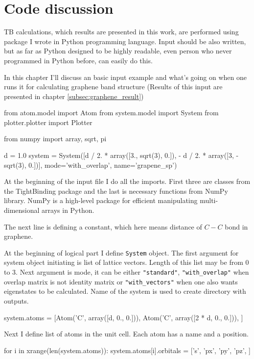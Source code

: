 \chapter{Code discussion}
TB calculations, which results are presented in this work, are performed using package I wrote in Python programming language. Input should be also written, but as far as Python designed to be highly readable, even person who never programmed in Python before, can easily do this. 

In this chapter I'll discuss an basic input example and what's going on when one runs it for calculating graphene band structure (Results of this input are presented in chapter \ref{subsec:graphene_result})

\begin{python}
from atom.model import Atom
from system.model import System
from plotter.plotter import Plotter

from numpy import array, sqrt, pi

d = 1.0
system = System([d / 2. * array([3., sqrt(3), 0.]),
                 - d / 2. * array([3, -sqrt(3), 0.])],
                mode='with_overlap', name='grapene_sp')
\end{python}
 
At the beginning of the input file I do all the imports. First three are classes from the TightBinding package and the last is necessary functions from NumPy library. NumPy is a high-level package for efficient manipulating multi-dimensional arrays in Python. 

The next line is defining a constant, which here means distance of $C-C$ bond in graphene.

At the beginning of logical part I define \verb!System! object. The first argument for system object initiating is list of lattice vectors. Length of this list may be from $0$ to $3$. Next argument is mode, it can be either \verb!"standard"!, \verb!"with_overlap"! when overlap matrix is not identity matrix or \verb!"with_vectors"! when one also wants eigenstates to be calculated. Name of the system is used to create directory with outputs.

\begin{python}
system.atoms = [Atom('C', array([d, 0., 0.])),
                Atom('C', array([2 * d, 0., 0.])), ]
\end{python}

Next I define list of atoms in the unit cell. Each atom has a name and a position.

\begin{python}
for i in xrange(len(system.atoms)):
    system.atoms[i].orbitals = ['s', 'px', 'py', 'pz', ]
\end{python}

